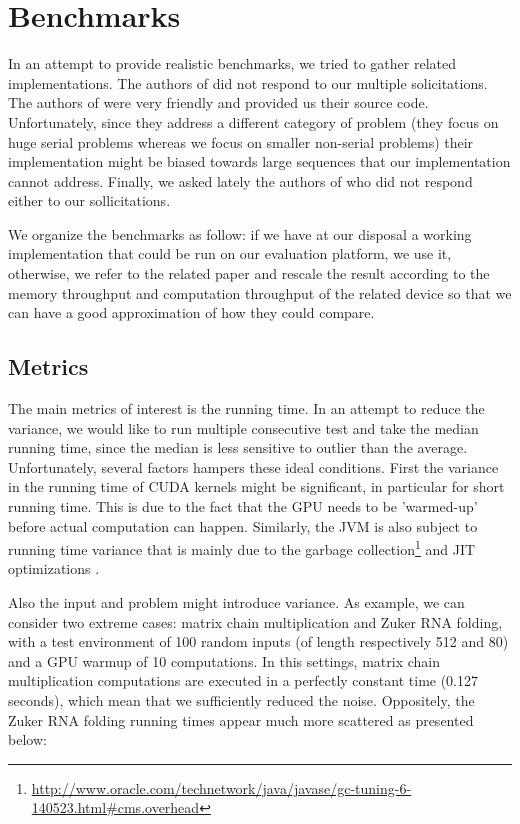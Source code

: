 \section{Benchmarks} \label{benchmarks}
In an attempt to provide realistic benchmarks, we tried to gather related implementations. The authors of \cite{gpu_atlp} did not respond to our multiple solicitations. The authors of \cite{swat_mega} were very friendly and provided us their source code. Unfortunately, since they address a different category of problem (they focus on huge serial problems whereas we focus on smaller non-serial problems) their implementation might be biased towards large sequences that our implementation cannot address. Finally, we asked lately the authors of \cite{gpu_rnafold} who did not respond either to our sollicitations.

We organize the benchmarks as follow: if we have at our disposal a working implementation that could be run on our evaluation platform, we use it, otherwise, we refer to the related paper and rescale the result according to the memory throughput and computation throughput of the related device so that we can have a good approximation of how they could compare.

\subsection{Metrics}
The main metrics of interest is the running time. In an attempt to reduce the variance, we would like to run multiple consecutive test and take the median running time, since the median is less sensitive to outlier than the average\cite{perfeval}. Unfortunately, several factors hampers these ideal conditions. First the variance in the running time of CUDA kernels might be significant, in particular for short running time. This is due to the fact that the GPU needs to be 'warmed-up' before actual computation can happen. Similarly, the JVM is also subject to running time variance that is mainly due to the garbage collection\footnote{\url{http://www.oracle.com/technetwork/java/javase/gc-tuning-6-140523.html\#cms.overhead}} and JIT optimizations \cite{java_jit}.

Also the input and problem might introduce variance. As example, we can consider two extreme cases: matrix chain multiplication and Zuker RNA folding, with a test environment of 100 random inputs (of length respectively 512 and 80) and a GPU warmup of 10 computations. In this settings, matrix chain multiplication computations are executed in a perfectly constant time (0.127 seconds), which mean that we sufficiently reduced the noise. Oppositely, the Zuker RNA folding running times appear much more scattered as presented below:

